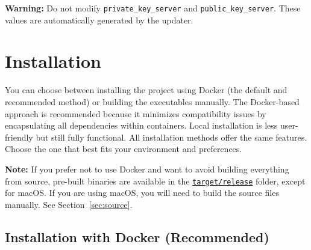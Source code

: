 \noindent
\begin{myWarning}
\textbf{Warning:} Do not modify \texttt{private\_key\_server} and \texttt{public\_key\_server}. These values are automatically generated by the updater.
\end{myWarning}

\section{Installation}

You can choose between installing the project using Docker (the default and recommended method) or building the executables manually.  
The Docker-based approach is recommended because it minimizes compatibility issues by encapsulating all dependencies within containers.  
Local installation is less user-friendly but still fully functional.  
All installation methods offer the same features. Choose the one that best fits your environment and preferences.

\vspace{10pt}
\noindent
\begin{myNote}
\textbf{Note:} If you prefer not to use Docker and want to avoid building everything from source, pre-built binaries are available in the \href{https://github.com/christiansassi/advanced-programming-of-cryptographic-methods-project/tree/main/target/release}{\texttt{target/release}} folder, except for macOS. If you are using macOS, you will need to build the source files manually. See Section~\ref{sec:source}.
\end{myNote}

\subsection{Installation with Docker (Recommended)}
\label{sec:docker}

